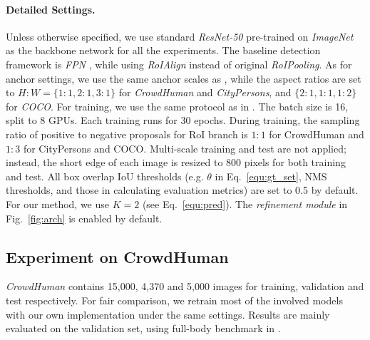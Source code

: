 \documentclass[10pt,twocolumn,letterpaper]{article}
\begin{document}
\paragraph{Detailed Settings. } 
\label{sec:detailed_setttings}
Unless otherwise specified, we use standard \emph{ResNet-50} \cite{he2016deep} pre-trained on \emph{ImageNet} \cite{russakovsky2015imagenet} as the backbone network for all the experiments. The baseline detection framework is \emph{FPN} \cite{lin2017feature}, while using \emph{RoIAlign} \cite{he2017mask} instead of original \emph{RoIPooling}. As for anchor settings, we use the same anchor scales as \cite{lin2017feature}, while the aspect ratios are set to $H:W = \{1:1, 2:1, 3:1\}$ for \emph{CrowdHuman} and \emph{CityPersons}, and $\{2:1, 1:1, 1:2\}$ for \emph{COCO}. For training, we use the same protocol as in \cite{lin2017feature}. The batch size is 16, split to 8 GPUs. Each training runs for 30 epochs. During training, the sampling ratio of positive to negative proposals for RoI branch is $1:1$ for CrowdHuman and $1:3$ for CityPersons and COCO. Multi-scale training and test are not applied; instead, the short edge of each image is resized to 800 pixels for both training and test.  All box overlap IoU thresholds (e.g. $\theta$ in Eq.~\ref{equ:gt_set}, NMS thresholds, and those in calculating evaluation metrics) are set to 0.5 by default. For our method, we use $K=2$ (see Eq.~\ref{equ:pred}). The \emph{refinement module} in Fig.~\ref{fig:arch} is enabled by default. 






\subsection{Experiment on CrowdHuman}

\emph{CrowdHuman} \cite{shao2018crowdhuman} contains 15,000, 4,370 and 5,000 images for training, validation and test respectively. For fair comparison, we retrain most of the involved models with our own implementation under the same settings. Results are mainly evaluated on the validation set, using full-body benchmark in \cite{shao2018crowdhuman}. 
\end{document}
